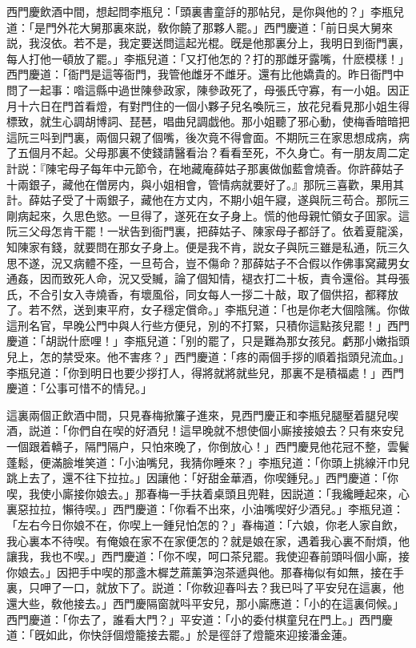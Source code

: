 西門慶飲酒中間，想起問李瓶兒：「頭裏書童㧱的那帖兒，是你與他的？」李瓶兒道：「是門外花大舅那裏來説，敎你饒了那夥人罷。」西門慶道：「前日吳大舅來説，我沒依。若不是，我定要送問這起光棍。旣是他那裏分上，我明日到衙門裏，每人打他一頓放了罷。」李瓶兒道：「又打他怎的？打的那雌牙露嘴，什麽模樣！」西門慶道：「衙門是這等衙門，我管他雌牙不雌牙。還有比他嬌貴的。昨日衙門中問了一起事：喒這縣中過世陳參政家，陳參政死了，母張氏守寡，有一小姐。因正月十六日在門首看燈，有對門住的一個小夥子兒名喚阮三，放花兒看見那小姐生得標致，就生心調胡博詞、琵琶，唱曲兒調戯他。那小姐聽了邪心動，使梅香暗暗把這阮三呌到門裏，兩個只親了個嘴，後次竟不得會面。不期阮三在家思想成病，病了五個月不起。父母那裏不使錢請醫看治？看看至死，不久身亡。有一朋友周二定計説：『陳宅母子每年中元節令，在地藏庵薛姑子那裏做伽藍會燒香。你許薛姑子十兩銀子，藏他在僧房内，與小姐相會，管情病就要好了。』那阮三喜歡，果用其計。薛姑子受了十兩銀子，藏他在方丈内，不期小姐午寢，遂與阮三苟合。那阮三剛病起來，久思色慾。一旦得了，遂死在女子身上。慌的他母親忙領女子囬家。這阮三父母怎肯干罷！一狀告到衙門裏，把薛姑子、陳家母子都㧱了。依着夏龍溪，知陳家有錢，就要問在那女子身上。便是我不肯，説女子與阮三雖是私通，阮三久思不遂，況又病體不痊，一旦苟合，豈不傷命？那薛姑子不合假以作佛事窝藏男女通姦，因而致死人命，況又受贓，論了個知情，褪衣打二十板，責令還俗。其母張氏，不合引女入寺燒香，有壞風俗，同女每人一拶二十敲，取了個供招，都釋放了。若不然，送到東平府，女子穩定償命。」李瓶兒道：「也是你老大個陰隲。你做這刑名官，早晚公門中與人行些方便兒，別的不打緊，只積你這點孩兒罷！」西門慶道：「胡説什麽哩！」李瓶兒道：「别的罷了，只是難為那女孩兒。虧那小嫩指頭兒上，怎的禁受來。他不害疼？」西門慶道：「疼的兩個手拶的順着指頭兒流血。」李瓶兒道：「你到明日也要少拶打人，得將就將就些兒，那裏不是積福處！」西門慶道：「公事可惜不的情兒。」

這裏兩個正飲酒中間，只見春梅掀簾子進來，見西門慶正和李瓶兒腿壓着腿兒喫酒，説道：「你們自在喫的好酒兒！這早晚就不想使個小廝接接娘去？只有來安兒一個跟着轎子，隔門隔户，只怕來晚了，你倒放心！」西門慶見他花冠不整，雲鬢蓬鬆，便滿臉堆笑道：「小油嘴兒，我猜你睡來？」李瓶兒道：「你頭上挑線汗巾兒跳上去了，還不往下拉拉。」因讓他：「好甜金華酒，你喫鍾兒。」西門慶道：「你喫，我使小廝接你娘去。」那春梅一手扶着桌頭且兜鞋，因説道：「我纔睡起來，心裏惡拉拉，懶待喫。」西門慶道：「你看不出來，小油嘴喫好少酒兒。」李瓶兒道：「左右今日你娘不在，你喫上一鍾兒怕怎的？」春梅道：「六娘，你老人家自飲，我心裏本不待喫。有俺娘在家不在家便怎的？就是娘在家，遇着我心裏不耐煩，他讓我，我也不喫。」西門慶道：「你不喫，呵口茶兒罷。我使迎春前頭呌個小廝，接你娘去。」因把手中喫的那盞木樨芝蔴薰笋泡茶遞與他。那春梅似有如無，接在手裏，只呷了一口，就放下了。説道：「你敎迎春呌去？我已呌了平安兒在這裏，他還大些，敎他接去。」西門慶隔窗就呌平安兒，那小廝應道：「小的在這裏伺候。」西門慶道：「你去了，誰看大門？」平安道：「小的委付棋童兒在門上。」西門慶道：「旣如此，你快㧱個燈籠接去罷。」於是徑㧱了燈籠來迎接潘金蓮。

